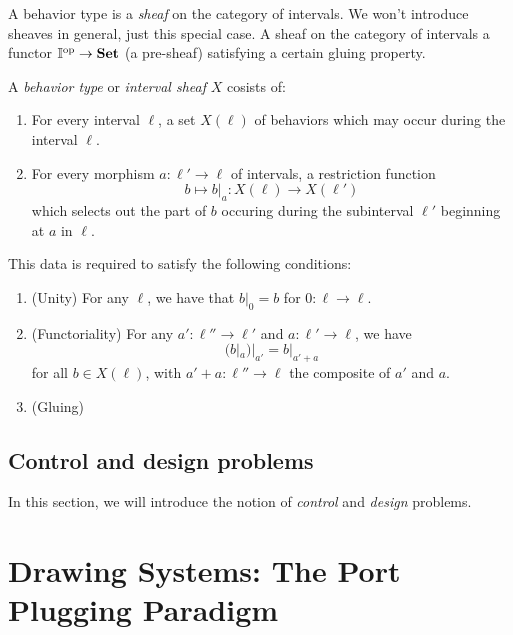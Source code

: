\documentclass[DynamicalBook]{subfiles}
\begin{document}
 A behavior type is a \emph{sheaf} on the category of intervals. We won't introduce sheaves in general, just this special case. A sheaf on the category of intervals a functor $\mathbb{I}^{\textnormal{op}} \to \textbf{Set}$ (a pre-sheaf) satisfying a certain gluing property.
 \begin{definition}
   A \emph{behavior type} or \emph{interval sheaf} $X$ cosists of:
   \begin{enumerate}
           \item For every interval $\ell$, a set $X(\ell)$ of behaviors which may occur during the interval $\ell$.
     \item For every morphism $a : \ell' \to \ell$ of intervals, a restriction function
           $$b \mapsto b|_{a} : X(\ell) \to X(\ell')$$
           which selects out the part of $b$ occuring during the subinterval $\ell'$ beginning at $a$ in $\ell$.
    \end{enumerate}
    This data is required to satisfy the following conditions:
    \begin{enumerate}
            \item (Unity) For any $\ell$, we have that $b|_{0} = b$ for $0 : \ell \to \ell$.
      \item (Functoriality) For any $a' : \ell'' \to \ell'$ and $a : \ell' \to \ell$, we have
            $$(b|_{a})|_{a'} = b|_{a' + a}$$
            for all $b \in X(\ell)$, with $a' + a : \ell'' \to \ell$ the composite of $a'$ and $a$.
            \item (Gluing)
    \end{enumerate}
\end{definition}

\subsection{Control and design problems}\label{sec:behavioral.control}

In this section, we will introduce the notion of \emph{control} and \emph{design} problems.

\section{Drawing Systems: The Port Plugging Paradigm}\label{sec:diagram.approach}
\end{document}
